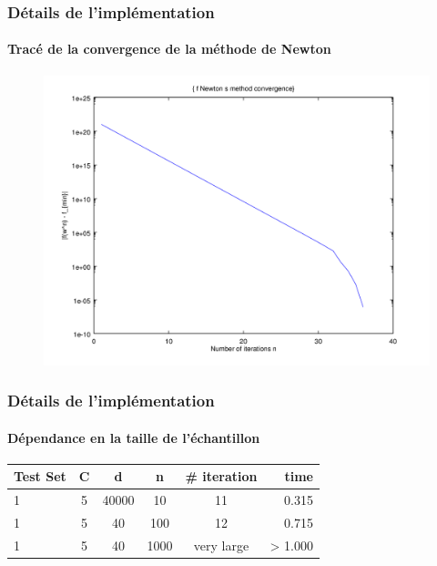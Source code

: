 \documentclass{beamer}
\begin{document}
\begin{frame}
\frametitle{Détails de l'implémentation}
\framesubtitle{Tracé de la convergence de la méthode de Newton}


         \begin{figure}
         \centering
         \includegraphics[scale=0.4]{images/cvnewton4.png}
         \end{figure}

\end{frame}

\begin{frame}
\frametitle{Détails de l'implémentation}
\framesubtitle{Dépendance en la taille de l'échantillon}


         \begin{center}
                \begin{tabular}{| l | c | c | c | c | r |}
                \hline
                Test Set & C & d & n &# iteration & time \\ \hline
                1 & 5 & 40000 & 10 & 11 & 0.315 \\ \hline
                1 & 5 & 40 & 100 & 12 & 0.715 \\ \hline
                1 & 5 & 40 & 1000 & very large & > 1.000 \\ \hline
                \end{tabular}
         \end{center}

\end{frame}
\end{document}
